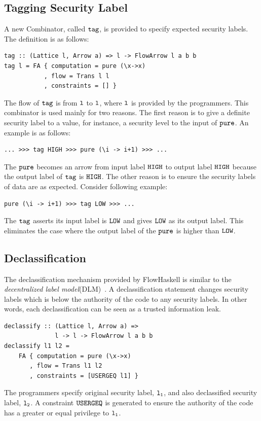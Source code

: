 \documentclass{report}
\newcommand{\co}[1]{$\cod{#1}$}
\begin{document}
\subsection{Tagging Security Label}
A new Combinator, called \co{tag}, is provided to specify expected security labels. The
definition is as follows:
\begin{Verbatim}[fontsize=\small]
tag :: (Lattice l, Arrow a) => l -> FlowArrow l a b b
tag l = FA { computation = pure (\x->x)
           , flow = Trans l l
           , constraints = [] }
\end{Verbatim}
The flow of \co{tag} is from \co{l} to \co{l}, where \co{l} is provided by the programmers.
This combinator is used mainly for two reasons. 
The first reason is to give a definite security label to a value, 
for instance, a security level to the input of \co{pure}. An example is as follows:
\begin{Verbatim}[fontsize=\small]
    ... >>> tag HIGH >>> pure (\i -> i+1) >>> ...
\end{Verbatim}
The \co{pure} becomes an arrow from input label \co{HIGH} to output label \co{HIGH} because the 
output label of \co{tag} is \co{HIGH}.
The other reason is to ensure the security labels of data are as expected. 
Consider following example:
\begin{Verbatim}[fontsize=\small]
    pure (\i -> i+1) >>> tag LOW >>> ...
\end{Verbatim}
The \co{tag} asserts its input label is \co{LOW} and gives \co{LOW} as its output label.
This eliminates the case where the output label of the \co{pure} is higher than \co{LOW}.
\subsection{Declassification}
The declassification mechanism provided by FlowHaskell is similar to the 
{\em decentralized label model}(DLM)~\cite{Myers:Liskov:TSEM2000}.
A declassification statement changes security labels which is below the authority of the 
code to any security labels.
In other words, each declassification can be seen as a trusted information leak. 
\begin{Verbatim}[fontsize=\small]
declassify :: (Lattice l, Arrow a) => 
              l -> l -> FlowArrow l a b b
declassify l1 l2 =
    FA { computation = pure (\x->x)
       , flow = Trans l1 l2
       , constraints = [USERGEQ l1] }
\end{Verbatim}
The programmers specify original security label, \co{l_1}, and also declassified security
label, \co{l_2}. A constraint \co{USERGEQ} is 
generated to ensure the authority of the code has a greater or equal privilege to \co{l_1}.
\end{document}
